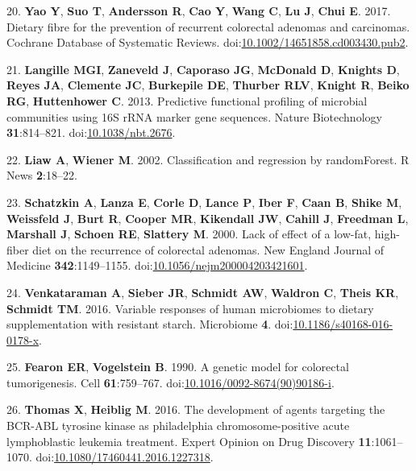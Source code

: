 \documentclass[11pt,]{article}
\begin{document}
\hypertarget{ref-Yao2017}{}
20. \textbf{Yao Y}, \textbf{Suo T}, \textbf{Andersson R}, \textbf{Cao
Y}, \textbf{Wang C}, \textbf{Lu J}, \textbf{Chui E}. 2017. Dietary fibre
for the prevention of recurrent colorectal adenomas and carcinomas.
Cochrane Database of Systematic Reviews.
doi:\href{https://doi.org/10.1002/14651858.cd003430.pub2}{10.1002/14651858.cd003430.pub2}.

\hypertarget{ref-Langille2013}{}
21. \textbf{Langille MGI}, \textbf{Zaneveld J}, \textbf{Caporaso JG},
\textbf{McDonald D}, \textbf{Knights D}, \textbf{Reyes JA},
\textbf{Clemente JC}, \textbf{Burkepile DE}, \textbf{Thurber RLV},
\textbf{Knight R}, \textbf{Beiko RG}, \textbf{Huttenhower C}. 2013.
Predictive functional profiling of microbial communities using 16S rRNA
marker gene sequences. Nature Biotechnology \textbf{31}:814--821.
doi:\href{https://doi.org/10.1038/nbt.2676}{10.1038/nbt.2676}.

\hypertarget{ref-randomforest_citation_2002}{}
22. \textbf{Liaw A}, \textbf{Wiener M}. 2002. Classification and
regression by randomForest. R News \textbf{2}:18--22.

\hypertarget{ref-Schatzkin2000}{}
23. \textbf{Schatzkin A}, \textbf{Lanza E}, \textbf{Corle D},
\textbf{Lance P}, \textbf{Iber F}, \textbf{Caan B}, \textbf{Shike M},
\textbf{Weissfeld J}, \textbf{Burt R}, \textbf{Cooper MR},
\textbf{Kikendall JW}, \textbf{Cahill J}, \textbf{Freedman L},
\textbf{Marshall J}, \textbf{Schoen RE}, \textbf{Slattery M}. 2000. Lack
of effect of a low-fat, high-fiber diet on the recurrence of colorectal
adenomas. New England Journal of Medicine \textbf{342}:1149--1155.
doi:\href{https://doi.org/10.1056/nejm200004203421601}{10.1056/nejm200004203421601}.

\hypertarget{ref-scfa_measures_venkataraman2016}{}
24. \textbf{Venkataraman A}, \textbf{Sieber JR}, \textbf{Schmidt AW},
\textbf{Waldron C}, \textbf{Theis KR}, \textbf{Schmidt TM}. 2016.
Variable responses of human microbiomes to dietary supplementation with
resistant starch. Microbiome \textbf{4}.
doi:\href{https://doi.org/10.1186/s40168-016-0178-x}{10.1186/s40168-016-0178-x}.

\hypertarget{ref-Fearon1990}{}
25. \textbf{Fearon ER}, \textbf{Vogelstein B}. 1990. A genetic model for
colorectal tumorigenesis. Cell \textbf{61}:759--767.
doi:\href{https://doi.org/10.1016/0092-8674(90)90186-i}{10.1016/0092-8674(90)90186-i}.

\hypertarget{ref-Thomas2016}{}
26. \textbf{Thomas X}, \textbf{Heiblig M}. 2016. The development of
agents targeting the BCR-ABL tyrosine kinase as philadelphia
chromosome-positive acute lymphoblastic leukemia treatment. Expert
Opinion on Drug Discovery \textbf{11}:1061--1070.
doi:\href{https://doi.org/10.1080/17460441.2016.1227318}{10.1080/17460441.2016.1227318}.
\end{document}

